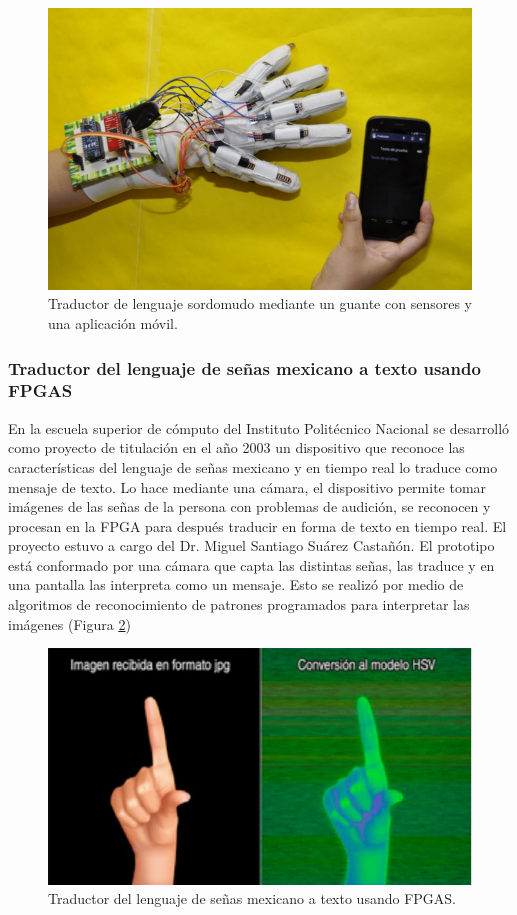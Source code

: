 		\begin{figure}[H]
			\centering
			\includegraphics[scale = 0.5]{figures/guanteUPIITA}
			\caption{Traductor de lenguaje sordomudo mediante un guante con sensores y una aplicación móvil.}
			\label{guanteUPIITA}
		\end{figure}	

	\subsubsection*{Traductor del lenguaje de señas mexicano a texto usando FPGAS}

	En la escuela superior de cómputo del Instituto Politécnico Nacional se desarrolló como proyecto de titulación en el año 2003 un dispositivo que reconoce las características del lenguaje de señas mexicano y en tiempo real lo traduce como mensaje de texto. Lo hace mediante una cámara, el dispositivo permite tomar imágenes de las señas de la persona con problemas de audición, se reconocen y procesan en la FPGA para después traducir en forma de texto en tiempo real. El proyecto estuvo a cargo del Dr. Miguel Santiago Suárez Castañón. El prototipo está conformado por una cámara que capta las distintas señas, las traduce y en una pantalla las interpreta como un mensaje. Esto se realizó por medio de algoritmos de reconocimiento de patrones programados para interpretar las imágenes \cite{Yucatan2013} (Figura \ref{traductorESCOM})

		\begin{figure}[H]
			\centering
			\includegraphics[scale = 0.5]{figures/traductorESCOM}
			\caption{Traductor del lenguaje de señas mexicano a texto usando FPGAS.}
			\label{traductorESCOM}
		\end{figure}

